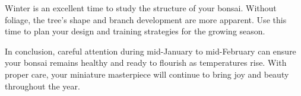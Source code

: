 \medskip

\noindent
Winter is an excellent time to study the structure of your bonsai. Without foliage, the tree's shape and branch development are more apparent. Use this time to plan your design and training strategies for the growing season.

\medskip

In conclusion, careful attention during mid-January to mid-February can ensure your bonsai remains healthy and ready to flourish as temperatures rise. With proper care, your miniature masterpiece will continue to bring joy and beauty throughout the year.

\closearticle